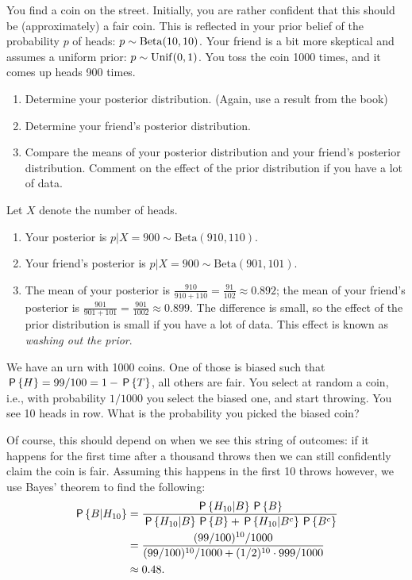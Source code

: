 \begin{exercise}
You find a coin on the street. Initially, you are rather confident that this should be (approximately) a fair coin. This is reflected in your prior belief of the probability $p$ of heads: $p \sim \Beta{10,10}$. Your friend is a bit more skeptical and assumes a uniform prior: $p \sim \Unif{0,1}$.  You toss the coin 1000 times, and it comes up heads 900 times.
\begin{enumerate}
\item Determine your posterior distribution. (Again, use  a result from the book)
\item Determine your friend's posterior distribution.
\item Compare the means of your posterior distribution and your friend's posterior distribution. Comment on the effect of the prior distribution if you have a lot of data.
\end{enumerate}
\begin{solution}
Let $X$ denote the number of heads.
\begin{enumerate}
    \item Your posterior is $p|X=900 \sim \text{Beta}(910,110)$.
    \item Your friend's posterior is $p|X=900 \sim \text{Beta}(901,101)$.
    \item The mean of your posterior is $\frac{910}{910+110} = \frac{91}{102} \approx 0.892$; the mean of your friend's posterior is  $\frac{901}{901+101} = \frac{901}{1002} \approx 0.899$. The difference is small, so the  effect of the prior distribution is small if you have a lot of data. This effect is known as \textit{washing out the prior}.
\end{enumerate}
\end{solution}
\end{exercise}


\begin{exercise}
We have an urn with 1000 coins. One of those is biased such that $\P{H} = 99/100 = 1-\P{T}$, all others are fair. You select at random a coin, i.e., with probability $1/1000$ you select the biased one, and start throwing. You see 10 heads in row. What is the probability you picked the biased coin?
\begin{solution}
Of course, this should depend on when we see this string of outcomes: if it happens for the first time after a thousand throws then we can still confidently claim the coin is fair. Assuming this happens in the first 10 throws however, we use Bayes' theorem to find the following:
\begin{align*}
    \P{B|H_{10}} &= \frac{\P{H_{10}|B}\P{B}}{\P{H_{10}|B}\P{B}+\P{H_{10}|B^c}\P{B^c}}\\
    &= \frac{(99/100)^{10}/1000}{(99/100)^{10}/1000+(1/2)^{10}\cdot999/1000}\\
    &\approx 0.48.
\end{align*}
\end{solution}
\end{exercise}


